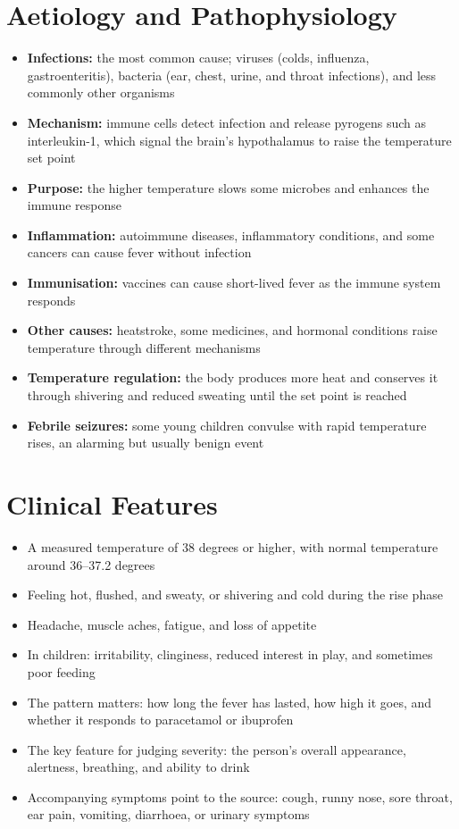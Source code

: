 \section*{Aetiology and Pathophysiology}
\begin{itemize}
    \item \textbf{Infections:} the most common cause; viruses (colds, influenza, gastroenteritis), bacteria (ear, chest, urine, and throat infections), and less commonly other organisms
    \item \textbf{Mechanism:} immune cells detect infection and release pyrogens such as interleukin-1, which signal the brain's hypothalamus to raise the temperature set point
    \item \textbf{Purpose:} the higher temperature slows some microbes and enhances the immune response
    \item \textbf{Inflammation:} autoimmune diseases, inflammatory conditions, and some cancers can cause fever without infection
    \item \textbf{Immunisation:} vaccines can cause short-lived fever as the immune system responds
    \item \textbf{Other causes:} heatstroke, some medicines, and hormonal conditions raise temperature through different mechanisms
    \item \textbf{Temperature regulation:} the body produces more heat and conserves it through shivering and reduced sweating until the set point is reached
    \item \textbf{Febrile seizures:} some young children convulse with rapid temperature rises, an alarming but usually benign event
\end{itemize}

\section*{Clinical Features}
\begin{itemize}
    \item A measured temperature of 38 degrees or higher, with normal temperature around 36--37.2 degrees
    \item Feeling hot, flushed, and sweaty, or shivering and cold during the rise phase
    \item Headache, muscle aches, fatigue, and loss of appetite
    \item In children: irritability, clinginess, reduced interest in play, and sometimes poor feeding
    \item The pattern matters: how long the fever has lasted, how high it goes, and whether it responds to paracetamol or ibuprofen
    \item The key feature for judging severity: the person's overall appearance, alertness, breathing, and ability to drink
    \item Accompanying symptoms point to the source: cough, runny nose, sore throat, ear pain, vomiting, diarrhoea, or urinary symptoms
\end{itemize}

